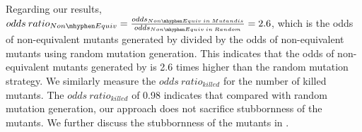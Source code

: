 Regarding our results, $odds\: ratio_{Non\mhyphen Equiv}=\frac{odds_{Non\mhyphen Equiv\: in\: Mutandis}}{odds_{Non\mhyphen Equiv\: in\: Random}}=2.6$, which is the odds of non-equivalent mutants generated by \mutandis divided by the odds of non-equivalent mutants using random mutation generation. This indicates that the odds of non-equivalent
mutants generated by \mutandis is 2.6 times higher than the random mutation strategy. We similarly measure the $odds\: ratio_{killed}$ for the number of killed mutants. The $odds\: ratio_{killed}$ of 0.98 indicates that compared with random mutation generation, our approach does not sacrifice stubbornness of the mutants. We further discuss the stubbornness of the mutants in .          


   
%

